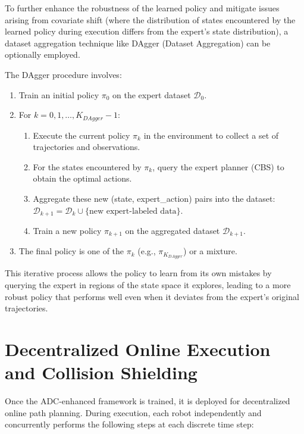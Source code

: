 To further enhance the robustness of the learned policy and mitigate issues arising from covariate shift (where the distribution of states encountered by the learned policy during execution differs from the expert's state distribution), a dataset aggregation technique like DAgger (Dataset Aggregation) \cite{Ross_et_al_2011} can be optionally employed.

The DAgger procedure involves:
\begin{enumerate}
    \item Train an initial policy $\pi_0$ on the expert dataset $\mathcal{D}_0$.
    \item For $k=0, 1, \dots, K_{DAgger}-1$:
        \begin{enumerate}
            \item Execute the current policy $\pi_k$ in the environment to collect a set of trajectories and observations.
            \item For the states encountered by $\pi_k$, query the expert planner (CBS) to obtain the optimal actions.
            \item Aggregate these new (state, expert\_action) pairs into the dataset: $\mathcal{D}_{k+1} = \mathcal{D}_k \cup \{\text{new expert-labeled data}\}$.
            \item Train a new policy $\pi_{k+1}$ on the aggregated dataset $\mathcal{D}_{k+1}$.
        \end{enumerate}
    \item The final policy is one of the $\pi_k$ (e.g., $\pi_{K_{DAgger}}$) or a mixture.
\end{enumerate}
This iterative process allows the policy to learn from its own mistakes by querying the expert in regions of the state space it explores, leading to a more robust policy that performs well even when it deviates from the expert's original trajectories.

\section{Decentralized Online Execution and Collision Shielding}

Once the ADC-enhanced framework is trained, it is deployed for decentralized online path planning. During execution, each robot independently and concurrently performs the following steps at each discrete time step:

